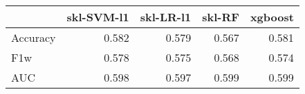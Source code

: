 \begin{tabular}{lrrrr}
\toprule
{} &  skl-SVM-l1 &  skl-LR-l1 &  skl-RF &  xgboost \\
\midrule
Accuracy &       0.582 &      0.579 &   0.567 &    0.581 \\
F1w      &       0.578 &      0.575 &   0.568 &    0.574 \\
AUC      &       0.598 &      0.597 &   0.599 &    0.599 \\
\bottomrule
\end{tabular}
